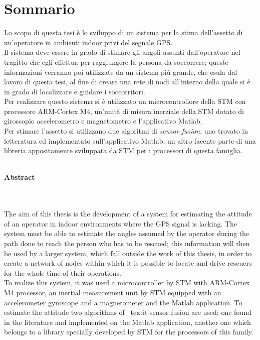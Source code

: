 \chapter*{Sommario}
\thispagestyle{empty}

Lo scopo di questa tesi è lo sviluppo di un sistema per la stima dell'assetto di un'operatore in ambienti indoor privi del segnale GPS.\\
Il sistema deve essere in grado di stimare gli angoli assunti dall'operatore nel tragitto che egli effettua per raggiungere la persona da soccorrere; queste informazioni verranno poi utilizzate da un sistema più grande, che esula dal lavoro di questa tesi, al fine di creare una rete di nodi all'interno della quale 
si è in grado di localizzare e guidare i soccorritori.\\
Per realizzare questo sistema si è utilizzato un microcontrollore della STM con processore ARM-Cortex M4, un'unità di misura inerziale della STM dotato di giroscopio accelerometro e magnetometro e l'applicativo Matlab.\\
Per stimare l'assetto si utilizzano due algoritmi di \textit{sensor fusion}; uno trovato in letteratura ed implementato sull'applicativo Matlab, un altro facente parte di una libreria appositamente sviluppata da STM per i processori di questa famiglia.
\\
\\

\noindent
\begin{Huge}
\textbf{Abstract}
\end{Huge}
\\
\\
\noindent
The aim of this thesis is the development of a system for estimating the attitude of an operator in indoor environments where the GPS signal is lacking.
The system must be able to estimate the angles assumed by the operator during the path done to reach the person who has to be rescued; this information will then be used by a larger system, which fall outside the work of this thesis, in order to create a network of nodes within which
it is possible to locate and drive rescuers for the whole time of their operations. \\
To realize this system, it was used a microcontroller by STM with ARM-Cortex M4 processor, an inertial measurement unit by STM equipped with an accelerometer gyroscope and a magnetometer and the Matlab application.
To estimate the attitude two algorithms of \ textit {sensor fusion} are used; one found in the literature and implemented on the Matlab application, another one  which belongs to a library specially developed by STM for the processors of this family.
